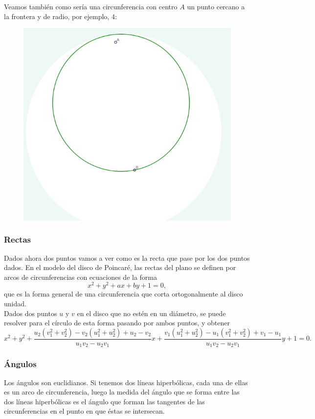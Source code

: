 \documentclass{article}
\theoremstyle{plain}
\theoremstyle{definition}
\theoremstyle{remark}
\begin{document}
Veamos también como sería una circunferencia con centro $A$ un punto
cercano a la frontera y de radio, por ejemplo, 4:

\begin{figure}[h]
\includegraphics{Circunferencia.png}
\end{figure}


\subsubsection{Rectas}

Dados ahora dos puntos vamos a ver como es la recta que pase por los
dos puntos dados. En el modelo del disco de Poincaré, las rectas del
plano se definen por arcos de circunferencias con ecuaciones de la
forma
\[x^2+y^2+ax+by+1=0,\]
que es la forma general de una circunferencia que corta ortogonalmente al disco unidad.\\
Dados dos puntos $u$ y $v$ en el disco que no estén en un diámetro, se
puede resolver para el círculo de esta forma pasando por ambos puntos,
y obtener
$$x^{2}+y^{2}+{\frac {u_{2}(v_{1}^{2}+v_{2}^{2})-v_{2}(u_{1}^{2}+u_{2}^{2})+u_{2}-v_{2}}{u_{1}v_{2}-u_{2}v_{1}}}x+{\frac {v_{1}(u_{1}^{2}+u_{2}^{2})-u_{1}(v_{1}^{2}+v_{2}^{2})+v_{1}-u_{1}}{u_{1}v_{2}-u_{2}v_{1}}}y+1=0.$$

\subsubsection{Ángulos}
Los ángulos son euclidianos. Si tenemos dos líneas hiperbólicas, cada
una de ellas es un arco de circunferencia, luego la medida del ángulo
que se forma entre las dos líneas hiperbólicas es el ángulo que forman
las tangentes de las circunferencias en el punto en que éstas se
intersecan.
\end{document}
